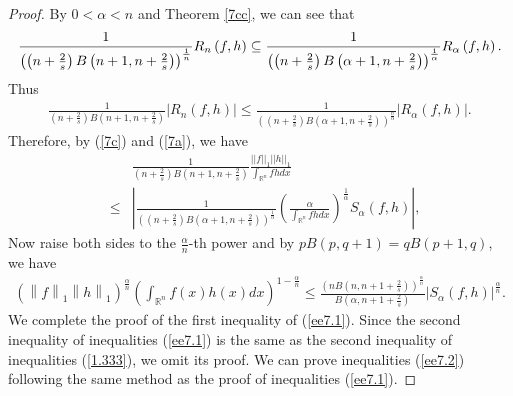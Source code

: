 \documentclass[preprint,12pt]{elsarticle}
\begin{document}
	\begin{proof}
		By $0<\alpha <n$ and Theorem \ref{7cc}, we can see that
		\begin{eqnarray*}
			\frac{1}{\left ( \left ( n+\frac{2}{s}   \right )B\left ( n +1 ,n+\frac{2}{s} \right )  \right )^{\frac{1}{n } }  }R_{n  }\left ( f,h \right )\subseteq \frac{1}{\left ( \left ( n+\frac{2}{s}   \right )B\left ( \alpha +1 ,n+\frac{2}{s} \right )  \right )^{\frac{1}{\alpha  } }  }R_{\alpha }\left ( f,h \right ) \notag.
		\end{eqnarray*} 
		Thus
		\begin{eqnarray*}
			\frac{1}{\left  ( n+\frac{2}{s}   \right )B\left ( n +1 ,n+\frac{2}{s} \right )   }\left|R_{n  }\left ( f,h \right )\right|\le \frac{1}{\left ( \left ( n+\frac{2}{s}   \right )B\left ( \alpha +1 ,n+\frac{2}{s} \right )  \right )^{\frac{n}{\alpha  } }  }\left|R_{\alpha }\left ( f,h \right )\right|.
		\end{eqnarray*}
		Therefore, by (\ref{7c}) and (\ref{7a}), we have 
		\begin{eqnarray*}
			&&\frac{1}{ \left ( n+\frac{2}{s}   \right )B\left ( n +1 ,n+\frac{2}{s} \right )    }\frac{{||f||}_{1}{||h||}_{1}}{{\int_{\mathbb{R}^n} }fhdx}\nonumber\\
			&\le& \left|\frac{1}{\left ( \left ( n+\frac{2}{s}   \right )B\left ( \alpha +1 ,n+\frac{2}{s} \right )  \right )^{\frac{1}{\alpha  } }  }\left(\frac{\alpha}{\int_{\mathbb{R}^n} fhdx}\right)^{\frac{1}{\alpha}}{S}_{\alpha }(f,h)\right|,
		\end{eqnarray*}
		Now raise both sides to the $\frac{\alpha}{n}$-th power and by $pB(p,q+1)=qB(p+1,q)$, we have
		\begin{eqnarray*}
			\left ( \left \| f \right \|_{1}\left \| h \right \|_{1}    \right )^{\frac{\alpha }{n} }\left ( \int_{\mathbb{R}^n }f\left ( x \right )h\left ( x \right )dx    \right )^{1-\frac{\alpha }{n} }\le \frac{\left ( nB\left ( n,n+1+\frac{2}{s}  \right )  \right )^{\frac{\alpha }{n} }  }{B\left ( \alpha ,n+1+\frac{2}{s} \right ) } \left | S_{\alpha }\left ( f,h \right )   \right |^{\frac{\alpha }{n} }.
		\end{eqnarray*}
		We complete the proof of the first inequality of (\ref{ee7.1}).
		Since the second inequality of inequalities (\ref{ee7.1}) is the same as the second inequality of inequalities (\ref{1.333}), we omit its proof. We can prove inequalities (\ref{ee7.2}) following the same method as the proof of inequalities (\ref{ee7.1}).
	\end{proof}
\end{document}
